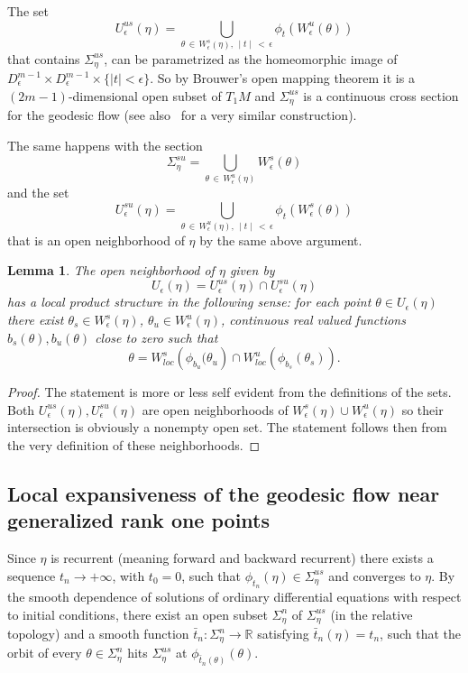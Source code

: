 \documentclass[10pt]{amsart}
\newtheorem{lemm}[cdrthm]{Lemma}
\theoremstyle{definition}
\newcommand{\bbR}{\mathbb{R}}
\begin{document}
The set
\[
U_{\epsilon}^{us}(\eta) = \bigcup_{\theta\,\in\,W^{s}_{\epsilon}(\eta),\,\mid t \mid\,<\,\epsilon} \phi_{t}\left(W^{u}_{\epsilon}(\theta)\right)
\]
that contains $\Sigma_{\eta}^{us}$, can be parametrized as the homeomorphic image of $D^{m-1}_{\epsilon} \times D^{m-1}_{\epsilon}\times\{ \mid t \mid <\epsilon\} $. So by Brouwer's open mapping theorem it is a $(2m-1)$-dimensional open subset of $T_{1}M$ and $\Sigma_{\eta}^{us}$ is a continuous cross section for the geodesic flow (see also~\cite{kn:Ruggiero-expansive} for a very similar construction).

The same happens with the section
\[
\Sigma_{\eta}^{su} = \bigcup_{\theta\,\in\,W^{u}_{\epsilon}(\eta)} W^{s}_{\epsilon}(\theta)
\]
and the set
\[
U_{\epsilon}^{su}(\eta) = \bigcup_{\theta\,\in\,W^{u}_{\epsilon}(\eta),\,\mid t \mid\,<\,\epsilon} \phi_{t}\left(W^{s}_{\epsilon}(\theta)\right)
\]
that is an open neighborhood of $\eta$ by the same above argument.


\begin{lemm}\label{product-structure}
The open neighborhood of $\eta$ given by
\[
U_{\epsilon}(\eta)= U_{\epsilon}^{us}(\eta) \cap U_{\epsilon}^{su}(\eta)
\]
has a local product structure in the following sense: for each point $\theta \in U_{\epsilon}(\eta)$ there exist $\theta_{s} \in W^{s}_{\epsilon}(\eta)$, $\theta_{u} \in W^{u}_{\epsilon}(\eta)$, continuous real valued functions $b_{s}(\theta), b_{u}(\theta)$ close to zero such that
\[
\theta = W^{s}_{loc}\left(\phi_{b_{u}}(\theta_{u}\right) \cap W^{u}_{loc}\left(\phi_{b_{s}}(\theta_{s})\right).
\]
\end{lemm}

\begin{proof}
The statement is more or less self evident from the definitions of the sets. Both $U_{\epsilon}^{us}(\eta), U_{\epsilon}^{su}(\eta)$ are open neighborhoods of $ W^{s}_{\epsilon}(\eta) \cup W^{u}_{\epsilon}(\eta)$ so their intersection is obviously a nonempty open set. The statement follows then from the very definition of these neighborhoods.
\end{proof}


\subsection{Local expansiveness of the geodesic flow near generalized rank one points}

Since $\eta$ is recurrent (meaning forward and backward recurrent) there exists a sequence $t_{n} \rightarrow +\infty$, with $t_{0}=0$, such that $\phi_{t_{n}}(\eta) \in \Sigma_{\eta}^{us}$ and converges to $\eta$. By the smooth dependence of solutions of ordinary differential equations with respect to initial conditions, there exist an open subset $\Sigma_{\eta}^{n}$ of $\Sigma_{\eta}^{us}$ (in the relative topology) and a smooth function $\bar{t}_{n} : \Sigma_{\eta}^{n} \longrightarrow \bbR$ satisfying $\bar{t}_{n}(\eta) = t_{n}$, such that the orbit of every $\theta \in \Sigma_{\eta}^{n}$ hits $\Sigma_{\eta}^{us}$ at $\phi_{\bar{t}_{n}(\theta)}(\theta)$.
\end{document}
